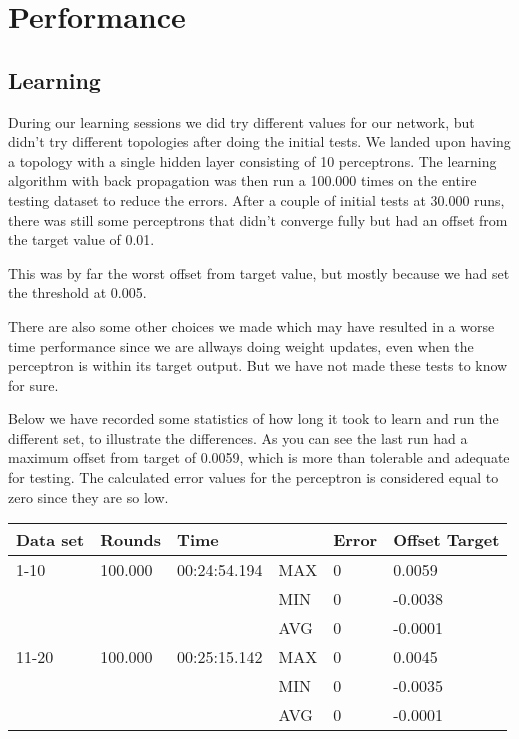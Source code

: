 \chapter{Performance}

\section{Learning}
During our learning sessions we did try different values for our network, but
didn't try different topologies after doing the initial tests. We landed upon
having a topology with a single hidden layer consisting of 10 perceptrons. The
learning algorithm with back propagation was then run a 100.000 times on the
entire testing dataset to reduce the errors. After a couple of initial tests at
30.000 runs, there was still some perceptrons that didn't converge fully but had
an offset from the target value of 0.01.

This was by far the worst offset from target value, but mostly because we had
set the threshold at 0.005.

There are also some other choices we made which may have resulted in a worse
time performance since we are allways doing weight updates, even when the
perceptron is within its target output.  But we have not made these tests to
know for sure.

Below we have recorded some statistics of how long it took to learn and run the
different set, to illustrate the differences. As you can see the last run had a
maximum offset from target of 0.0059, which is more than tolerable and adequate
for testing.  The calculated error values for the perceptron is considered equal
to zero since they are so low.

\begin{longtable}{ p{} p{} p{} 
									 p{} p{} p{} }
\textbf{Data set} & \textbf{Rounds}		& \textbf{Time} 			& & 
									  \textbf{Error}	& \textbf{Offset Target} \\\hline 
1-10	& 100.000 & 00:24:54.194	& MAX 	& 0	& 0.0059 	\\
			& 				& 							& MIN 	& 0	& -0.0038	\\
			& 				& 							& AVG 	& 0	& -0.0001	\\
11-20	& 100.000 & 00:25:15.142	& MAX 	& 0	& 0.0045	\\
			& 				& 							& MIN 	& 0	& -0.0035	\\
			& 				& 							& AVG 	& 0	& -0.0001	\\
\end{longtable}


